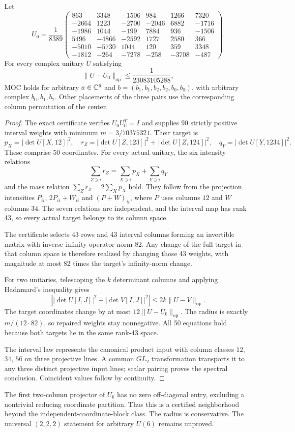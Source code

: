 \begin{theorem}\label{local222}
Let
\[
U_0=\frac1{8389}
\begin{pmatrix}
863&3348&-1506&984&1266&7320\\
-2664&1223&-2700&-2046&6882&-1716\\
-1986&1044&-199&7884&936&-1506\\
5496&-4866&-2592&1727&2580&366\\
-5010&-5730&1044&120&359&3348\\
-1812&-264&-7278&-258&-3708&-487
\end{pmatrix}.
\]
For every complex unitary $U$ satisfying
\[
\|U-U_0\|_{\mathrm{op}}\le\frac1{23083105288},
\]
MOC holds for arbitrary $a\in\mathbb C^6$ and
$b=(b_1,b_1,b_2,b_2,b_0,b_0)$, with arbitrary complex $b_0,b_1,b_2$.
Other placements of the three pairs use the corresponding column permutation of the center.
\end{theorem}
\begin{proof}
The exact certificate verifies $U_0U_0^T=I$ and supplies 90 strictly positive interval weights with minimum
$m=3/70375321$. Their target is
\[
p_X=|\det U[X,12]|^2,\quad
r_Z=|\det U[Z,123]|^2+|\det U[Z,124]|^2,\quad
q_Y=|\det U[Y,1234]|^2.
\]
These comprise 50 coordinates. For every actual unitary, the six intensity relations
\[
\sum_{Z\ni i}r_Z=\sum_{X\ni i}p_X+\sum_{Y\ni i}q_Y
\]
and the mass relation $\sum_Zr_Z=2\sum_Xp_X$ hold. They follow from the projection intensities $P_{ii}$, $2P_{ii}+W_{ii}$ and $(P+W)_{ii}$, where $P$ uses columns $12$ and $W$ columns $34$. The seven relations are independent, and the interval map has rank 43, so every actual target belongs to its column space.

The certificate selects 43 rows and 43 interval columns forming an invertible matrix with inverse infinity operator norm 82. Any change of the full target in that column space is therefore realized by changing those 43 weights, with magnitude at most 82 times the target's infinity-norm change.

For two unitaries, telescoping the $k$ determinant columns and applying Hadamard's inequality gives
\[
\left||\det U[I,J]|^2-|\det V[I,J]|^2\right|
\le2k\|U-V\|_{\mathrm{op}}.
\]
The target coordinates change by at most $12\|U-U_0\|_{\mathrm{op}}$. The radius is exactly $m/(12\cdot82)$, so repaired weights stay nonnegative. All 50 equations hold because both targets lie in the same rank-43 space.

The interval law represents the canonical product input with column classes $12$, $34$, $56$ on three projective lines. A common $GL_2$ transformation transports it to any three distinct projective input lines; scalar pairing proves the spectral conclusion. Coincident values follow by continuity.
\end{proof}

The first two-column projector of $U_0$ has no zero off-diagonal entry, excluding a nontrivial reducing coordinate partition. Thus this is a certified neighborhood beyond the independent-coordinate-block class. The radius is conservative. The universal $(2,2,2)$ statement for arbitrary $U(6)$ remains unproved.
